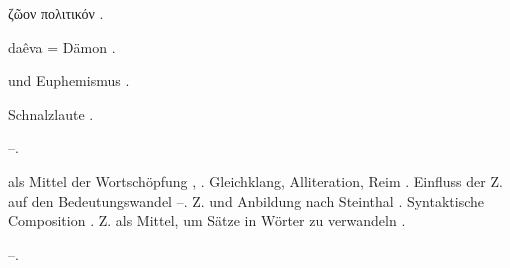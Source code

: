 \begin{register}

ζῶον πολιτικόν \pageref{sp.307}.

 daêva = Dämon \pageref{sp.231}.

 und Euphemismus \pageref{sp.249}.


 Schnalzlaute \pageref{sp.269}.



 \pageref{sp.37}–\pageref{sp.38}.

 als Mittel der Wortschöpfung \pageref{sp.41}, \pageref{sp.346}. Gleichklang, Alliteration, Reim \pageref{sp.222}. Einfluss der Z. auf den Bedeutungswandel \pageref{sp.234}–\pageref{sp.237}. Z. und Anbildung nach Steinthal \pageref{sp.337}. Syntaktische Composition \pageref{sp.359}. Z. als Mittel, um Sätze in Wörter zu verwandeln \pageref{sp.466}.




 \pageref{sp.456}–\pageref{sp.458}.
\end{register}

 